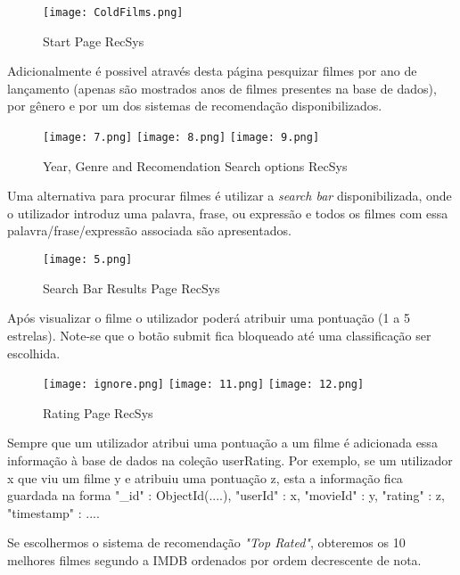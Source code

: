 \begin{figure}[H]
\centering
\texttt{[image: ColdFilms.png]}
\caption {Start Page RecSys}
\label {fig10}
\end{figure}

Adicionalmente é possivel através desta página pesquizar filmes por ano de lançamento (apenas são mostrados anos de filmes presentes na base de dados), por gênero e por um dos sistemas de recomendação disponibilizados.\newline


\begin{figure}[H]
\centering
\texttt{[image: 7.png]}
\texttt{[image: 8.png]}
\texttt{[image: 9.png]}
\caption {Year, Genre and Recomendation Search options RecSys}
\label {fig11}
\end{figure}

Uma alternativa para procurar filmes é utilizar a \textit{search bar} disponibilizada, onde o utilizador introduz uma palavra, frase, ou expressão e todos os filmes com essa palavra/frase/expressão associada são apresentados.\newline

\begin{figure}[H]
\centering
\texttt{[image: 5.png]}
\caption {Search Bar Results Page RecSys}
\label {fig12}
\end{figure}

Após visualizar o filme o utilizador poderá atribuir uma pontuação (1 a 5 estrelas). Note-se que o botão submit fica bloqueado até uma classificação ser escolhida.

\begin{figure}[H]
\centering
\texttt{[image: ignore.png]}
\texttt{[image: 11.png]}
\texttt{[image: 12.png]}
\caption {Rating Page RecSys}
\label {fig13}
\end{figure}


Sempre que um utilizador atribui uma pontuação a um filme é adicionada essa informação à base de dados na coleção userRating. Por exemplo, se um utilizador x que viu um filme y e atribuiu uma pontuação z, esta a informação fica guardada na forma {"\_id" : ObjectId(....), "userId" : x, "movieId" : y, "rating" : z, "timestamp" : ...}.\newline


\par Se escolhermos o sistema de recomendação \textit{"Top Rated"}, obteremos os 10 melhores filmes segundo a IMDB ordenados por ordem decrescente de nota.\newline


